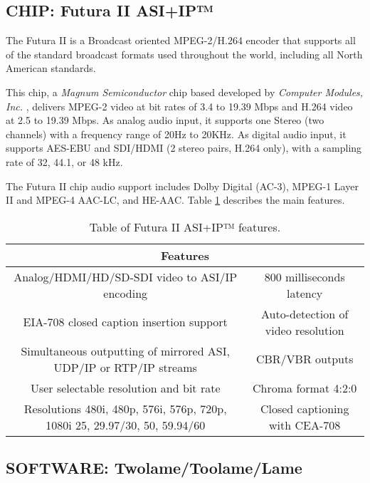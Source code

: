 \subsection{CHIP: Futura II ASI+IP™}

The Futura II \cite{futura} is a Broadcast oriented MPEG-2/H.264 encoder that supports all of the standard broadcast formats used throughout the world, including all North American standards. 

This chip, a \textit{Magnum Semiconductor} chip based developed by \textit{Computer Modules, Inc.} \cite{computermodules}, delivers MPEG-2 video at bit rates of 3.4 to 19.39 Mbps and H.264 video at 2.5 to 19.39 Mbps.
As analog audio input, it supports one Stereo (two channels) with a frequency range of 20Hz to 20KHz. As digital audio input, it supports AES-EBU and SDI/HDMI (2 stereo pairs, H.264 only), with a sampling rate of 32, 44.1, or 48 kHz.

The Futura II chip audio support includes Dolby Digital (AC-3), MPEG-1 Layer II and MPEG-4 AAC-LC, and HE-AAC.
Table \ref{futura} describes the main features.

\begin{table}[h]
    \centering
    \begin{tabular}{|c|c|}
        \hline
        \multicolumn{2}{|c|}{\textbf{Features}} \\
        \hline
         Analog/HDMI/HD/SD-SDI video to ASI/IP encoding & 800 milliseconds latency \\
         \hline
          EIA-708 closed caption insertion support & Auto-detection of video resolution \\
         \hline
         Simultaneous outputting of mirrored ASI, UDP/IP or RTP/IP streams & CBR/VBR outputs \\
         \hline
         User selectable resolution and bit rate & Chroma format 4:2:0 \\
         \hline
         Resolutions 480i, 480p, 576i, 576p, 720p, 1080i 25, 29.97/30, 50, 59.94/60 & Closed captioning with CEA-708 \\
         \hline
    \end{tabular}
    \caption{Table of Futura II ASI+IP™ features.}
    \label{futura}
\end{table}

\subsection{SOFTWARE: Twolame/Toolame/Lame}

